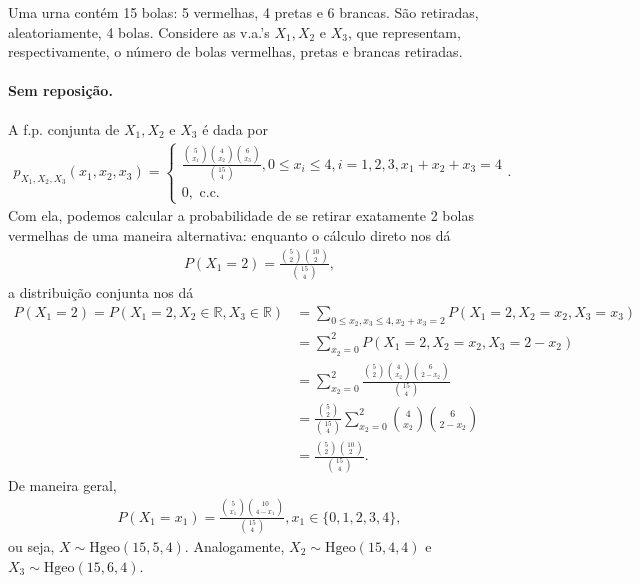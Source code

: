 \documentclass[../Notas.tex]{subfiles}
\begin{document}
\begin{example}
Uma urna contém 15 bolas: 5 vermelhas, 4 pretas e 6 brancas. São retiradas, aleatoriamente, 4 bolas. Considere as v.a.'s $X_1, X_2$ e $X_3$, que representam, respectivamente, o número de bolas vermelhas, pretas e brancas retiradas.
\paragraph{Sem reposição.} A f.p. conjunta de $X_1, X_2$ e $X_3$ é dada por
\begin{align*}
    p_{X_1, X_2, X_3}(x_1, x_2, x_3) = \begin{cases}
    \displaystyle{\frac{ \binom{5}{x_1}\binom{4}{x_2}\binom{6}{x_3} }{\binom{15}{4}}}, 0\leq x_i\leq 4, i = 1, 2, 3, x_1 + x_2 + x_3 = 4 \\
    0, \text{ c.c.}
    \end{cases}.
\end{align*}
Com ela, podemos calcular a probabilidade de se retirar exatamente 2 bolas vermelhas de uma maneira alternativa: enquanto o cálculo direto nos dá
\begin{align*}
    P(X_1 = 2) = \frac{ \binom{5}{2}\binom{10}{2} }{ \binom{15}{4} },
\end{align*}
a distribuição conjunta nos dá
\begin{align*}
    P(X_1 = 2) = P(X_1 = 2, X_2\in\mathbb{R}, X_3\in\mathbb{R}) &= \sum_{0\leq x_2,x_3\leq 4, x_2+x_3=2} P(X_1 = 2, X_2=x_2, X_3=x_3) \\
    &= \sum_{x_2 = 0}^{2} P(X_1 = 2, X_2 = x_2, X_3 = 2-x_2) \\
    &= \sum_{x_2=0}^{2} \frac{ \binom{5}{2}\binom{4}{x_2}\binom{6}{2-x_2} }{\binom{15}{4}} \\
    &= \frac{\binom{5}{2}}{\binom{15}{4}}\sum_{x_2=0}^{2} \binom{4}{x_2}\binom{6}{2-x_2} \\
    &= \frac{\binom{5}{2}\binom{10}{2}}{\binom{15}{4}}.
\end{align*}
De maneira geral,
\begin{align*}
    P(X_1=x_1) = \frac{\binom{5}{x_1}\binom{10}{4-x_1}}{\binom{15}{4}}, x_1 \in\{0, 1, 2, 3, 4\},
\end{align*}
ou seja, $X\sim\text{Hgeo}(15, 5, 4)$. Analogamente, $X_2\sim\text{Hgeo}(15,4,4)$ e $X_3\sim\text{Hgeo}(15,6,4)$.


\end{example}
\end{document}
